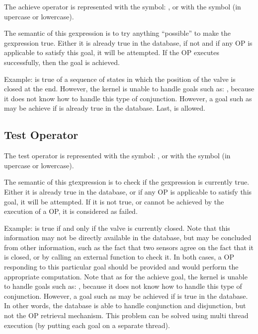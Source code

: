 The achieve operator is represented with the symbol: \samp{!}, or with the
symbol  (in upercase or lowercase).

The semantic of this gexpression is to try anything ``possible'' to make the
gexpression true. Either it is already true in the database, if not and if any
OP is applicable to satisfy this goal, it will be attempted. If the OP executes
successfully, then the goal is achieved.

Example:  is true of a sequence of states in
which the position of the valve is closed at the end. However, the kernel is
unable to handle goals such as: , because it does not know how to handle this type of
conjunction. However, a goal such as  may be achieve if  is already true in the database. Last,  is allowed.

\subsection{Test Operator}

The test operator is represented with the symbol: , or with the
symbol  (in upercase or lowercase).

The semantic of this gtexpression is to check if the gexpression is
currently true. Either it is already true in the database, or if any OP is
applicable to satisfy this goal, it will be attempted. If it is not true,
or cannot be achieved by the execution of a OP, it is considered as
failed.

Example:  is true if and only if the valve is
currently closed. Note that this information may not be directly available in
the database, but may be concluded from other information, such as the fact
that two sensors agree on the fact that it is closed, or by calling an external
function to check it. In both cases, a OP responding to this particular goal
should be provided and would perform the appropriate computation. Note that as
for the achieve goal, the kernel is unable to handle goals such as: , because it does not know
how to handle this type of conjunction. However, a goal such as  may be achieved if  is true in the database. In other
words, the database is able to handle conjunction and disjunction, but not the
OP retrieval mechanism. This problem can be solved using multi thread
execution (by putting each goal on a separate thread).

